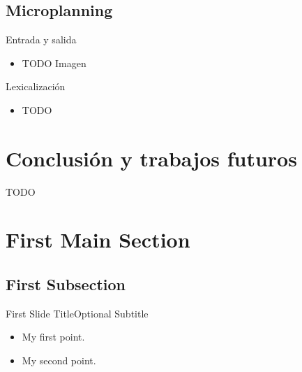 \documentclass{beamer}
\begin{document}
      \subsection{Microplanning}
      \begin{frame}{Entrada y salida}{}
        \begin{itemize}
          \item TODO Imagen
        \end{itemize}
      \end{frame}
                  										
      \begin{frame}{Lexicalización}{}
        \begin{itemize}
          \item TODO
        \end{itemize}
      \end{frame}
                  										
      \section{Conclusión y trabajos futuros}
      \begin{frame}{TODO}{}
                        													
      \end{frame}
                  										
      \section{First Main Section}
                  										
      \subsection{First Subsection}
                  										
      \begin{frame}{First Slide Title}{Optional Subtitle}
        \begin{itemize}
          \item {
              My first point.
            }
            \item {
                My second point.
              }
            \end{itemize}
          \end{frame}
                              																
\end{document}
